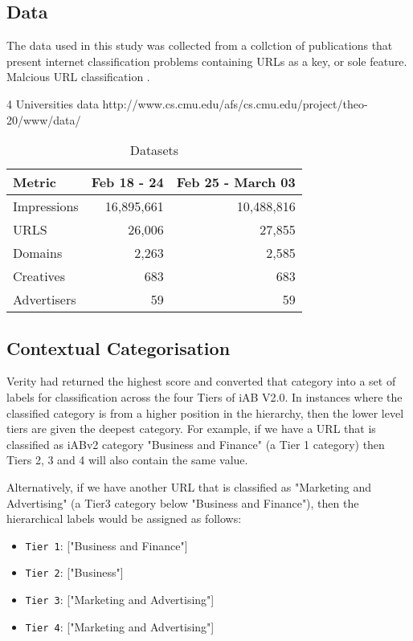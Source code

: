 \documentclass[sigconf]{acmart}
\begin{document}
\subsection{Data}

The data used in this study was collected from a collction of publications that 
present internet classification problems containing URLs as a key, or sole feature.
Malcious URL classification \cite{Mamun2016}.


4 Universities data http://www.cs.cmu.edu/afs/cs.cmu.edu/project/theo-20/www/data/


\begin{table}
\caption{Datasets}
\label{tab:dataset}
\begin{tabular}{|l|r|r|}
\toprule
Metric          &Feb 18 - 24    &Feb 25 - March 03          \\
\midrule
Impressions     &16,895,661     &10,488,816     \\
URLS            &26,006         &27,855         \\
Domains         &2,263          &2,585          \\
Creatives       &683            &683            \\
Advertisers     &59             &59             \\
\bottomrule
\end{tabular}
\end{table}

\subsection{Contextual Categorisation}

Verity had returned the
highest score and converted that category into a set of labels for
classification across the four Tiers of iAB V2.0. In instances where the
classified category is from a higher position in the hierarchy, then the
lower level tiers are given the deepest category. For example, if we have
a URL that is classified as iABv2 category "Business and Finance"
(a Tier 1 category) then Tiers 2, 3 and 4 will also contain the same value.

Alternatively, if we have another URL that is classified as "Marketing and Advertising"
(a Tier3 category below "Business and Finance"), then the hierarchical labels
would be assigned as follows:

\begin{itemize}
    \item {\texttt{Tier 1}}: ["Business and Finance"]
    \item {\texttt{Tier 2}}: ["Business"]
    \item {\texttt{Tier 3}}: ["Marketing and Advertising"]
    \item {\texttt{Tier 4}}: ["Marketing and Advertising"]
\end{itemize}
\end{document}
